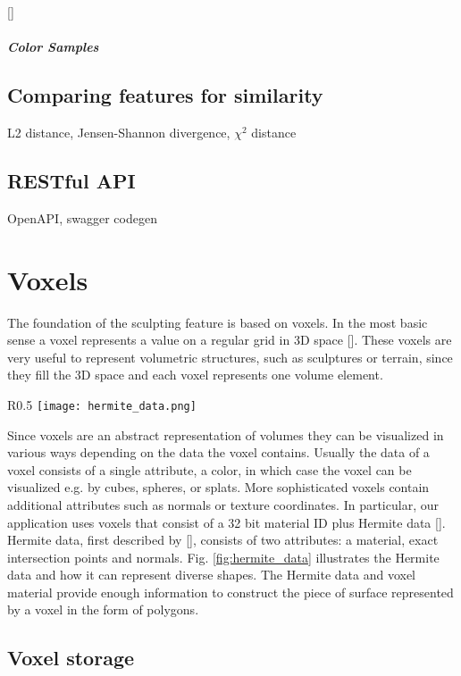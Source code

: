 []

\subparagraph{Color Samples}

\subsection{Comparing features for similarity}
L2 distance, Jensen-Shannon divergence, $\chi^2$ distance


\subsection{RESTful API}
OpenAPI, swagger codegen

\section{Voxels}

The foundation of the sculpting feature is based on voxels. In the most basic sense a voxel represents a value on a regular grid
in 3D space []. These voxels are very useful to represent volumetric structures, such as sculptures
or terrain, since they fill the 3D space and each voxel represents one volume element.

\begin{wrapfigure}{R}{0.5\textwidth}
\texttt{[image: hermite\_data.png]}
\caption{Hermite data.}
\label{fig:hermite_data}
\end{wrapfigure}

Since voxels are an abstract representation of volumes they can be visualized in various ways depending on the data the voxel contains.
Usually the data of a voxel consists of a single attribute, a color, in which case the voxel can be visualized e.g. by cubes, spheres, or splats.
More sophisticated voxels contain additional attributes such as normals or texture coordinates. In particular, our application uses voxels that
consist of a 32 bit material ID plus Hermite data []. Hermite data, first described by [],
consists of two attributes: a material, exact intersection points and normals. Fig. \ref{fig:hermite_data} illustrates the Hermite data and how it can represent
diverse shapes. The Hermite data and voxel material provide enough information to construct the piece of surface represented by a voxel in the form of polygons.

\subsection{Voxel storage}

